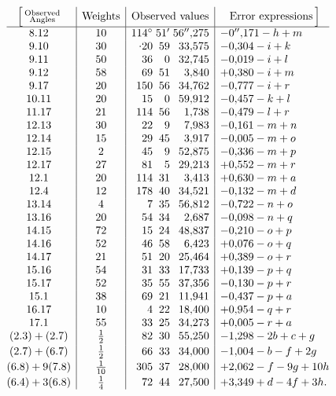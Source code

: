 \[
\begin{array}{@{}c|c|r@{\;}r@{\;}r|l@{}}
 \Bigl[\,\substack{\text{Observed}\\\text{Angles}}&
 \text{Weights}&\multicolumn{3}{c|}{\text{Observed values}}&
 \multicolumn{1}{c@{}}{\text{Error expressions}\,\Bigr]}\\
 \hline
 8.12&10&114^\circ&51'&56''{,}275&-0''{,}171-h+m\\
 9.10&30&\mathord{\raisebox{.55ex}{.}}20&59&33{,}575&-0{,}304-i+k\\
 9.11&50&36&0&32{,}745&-0{,}019-i+l\\
 9.12&58&69&51&3{,}840&+0{,}380-i+m\\
 9.17&20&150&56&34{,}762&-0{,}777-i+r\\
 10.11&20&15&0&59{,}912&-0{,}457-k+l\\
 11.17&21&114&56&1{,}738&-0{,}479-l+r\\
 12.13&30&22&9&7{,}983&-0{,}161-m+n\\
 12.14&15&29&45&3{,}917&-0{,}005-m+o\\
 12.15&2&45&9&52{,}875&-0{,}336-m+p\\
 12.17&27&81&5&29{,}213&+0{,}552-m+r\\
 12.1&20&114&31&3{,}413&+0{,}630-m+a\\
 12.4&12&178&40&34{,}521&-0{,}132-m+d\\
 13.14&4&7&35&56{,}812&-0{,}722-n+o\\
 13.16&20&54&34&2{,}687&-0{,}098-n+q\\
 14.15&72&15&24&48{,}837&-0{,}210-o+p\\
 14.16&52&46&58&6{,}423&+0{,}076-o+q\\
 14.17&21&51&20&25{,}464&+0{,}389-o+r\\
 15.16&54&31&33&17{,}733&+0{,}139-p+q\\
 15.17&52&35&55&37{,}356&-0{,}130-p+r\\
 15.1&38&69&21&11{,}941&-0{,}437-p+a\\
 16.17&10&4&22&18{,}400&+0{,}954-q+r\\
 17.1&55&33&25&34{,}273&+0{,}005-r+a\\
 (2.3)+(2.7)&\frac12&82&30&55{,}250&-1{,}298-2b+c+g\\[2pt]
 (2.7)+(6.7)&\frac12&66&33&34{,}000&-1{,}004-b-f+2g\\[2pt]
 (6.8)+9(7.8)&\frac{1}{10}&305&37&28{,}000&+2{,}062-f-9g+10h\\[2pt]
 (6.4)+3(6.8)&\frac14&72&44&27{,}500&+3{,}349+d-4f+3h.
\end{array}
\]

